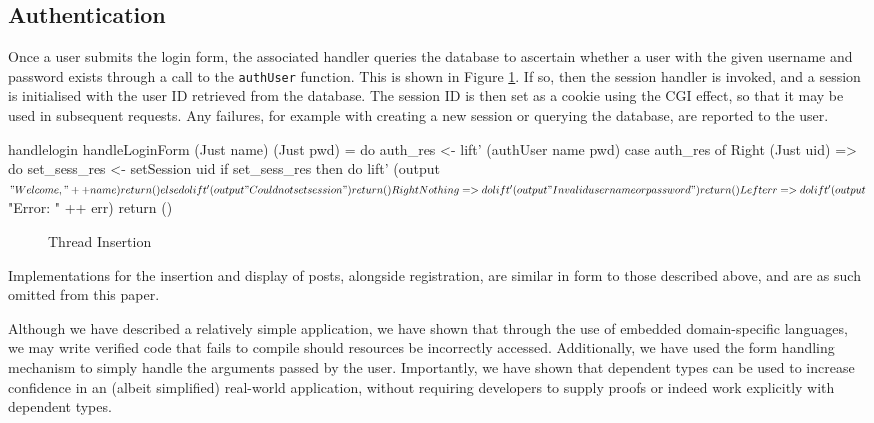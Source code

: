 \subsection{Authentication}

Once a user submits the login form, the associated handler queries the database
to ascertain whether a user with the given username and password exists through
a call to the \texttt{authUser} function. This is shown in Figure
\ref{fig:handlelogin}. If so, then the session handler is
invoked, and a session is initialised with the user ID retrieved from the
database. The session ID is then set as a cookie using the CGI effect, so that
it may be used in subsequent requests. Any failures, for example with creating
a new session or querying the database, are reported to the user.

\begin{SaveVerbatim}{handlelogin}
handleLoginForm (Just name) (Just pwd) = do
  auth_res <- lift' (authUser name pwd)
  case auth_res of
    Right (Just uid) => do
      set_sess_res <- setSession uid
      if set_sess_res then do
        lift' (output $ "Welcome, " ++ name)
        return ()
      else do
        lift' (output "Could not set session")
         return ()
    Right Nothing => do
      lift' (output "Invalid username or password")
      return ()
    Left err => do
      lift' (output $ "Error: " ++ err)
      return ()
\end{SaveVerbatim}

\begin{figure}[h]
\caption{Thread Insertion}
\label{fig:handlelogin}
\end{figure}

Implementations for the insertion and display of posts, alongside registration,
are similar in form to those described above, and are as such omitted from this
paper.

Although we have described a relatively simple application, we have shown that
through the use of embedded domain-specific languages, we may write verified
code that fails to compile should resources be incorrectly accessed.
Additionally, we have used the form handling mechanism to simply handle the
arguments passed by the user. Importantly, we have shown that dependent types
can be used to increase confidence in an (albeit simplified) real-world
application, without requiring developers to supply proofs or indeed work
explicitly with dependent types. 

